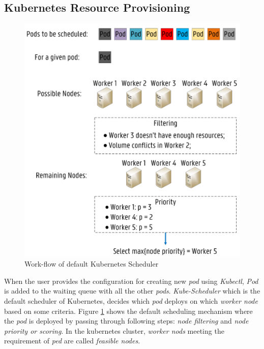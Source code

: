 \subsection{Kubernetes Resource Provisioning}
\label{sec:k8s_scheduler}
\begin{figure}
  \centering
  \includegraphics[width=\linewidth]{figures/mlcn-k8s-scheduler.pdf}
  \caption{Work-flow of default Kubernetes Scheduler\cite{Santos2019}}
  \label{fig:k8s-sch}
\end{figure}
When the user provides the configuration for creating new \emph{pod} using \emph{Kubectl}, \emph{Pod} is added to the waiting queue with all the other \emph{pods}\cite{Santos2019}. \emph{Kube-Scheduler} which is the default scheduler of Kubernetes, decides which \emph{pod} deploys on which \emph{worker node} based on some criteria. Figure \ref{fig:k8s-sch} shows the default scheduling mechanism where the \emph{pod} is deployed by passing through following steps: \emph{node filtering} and \emph{node priority or scoring}\cite{Santos2019}. In the kubernetes cluster, \emph{worker nods} meeting the requirement of \emph{ped} are called \emph{feasible nodes}\cite{k8s}.
